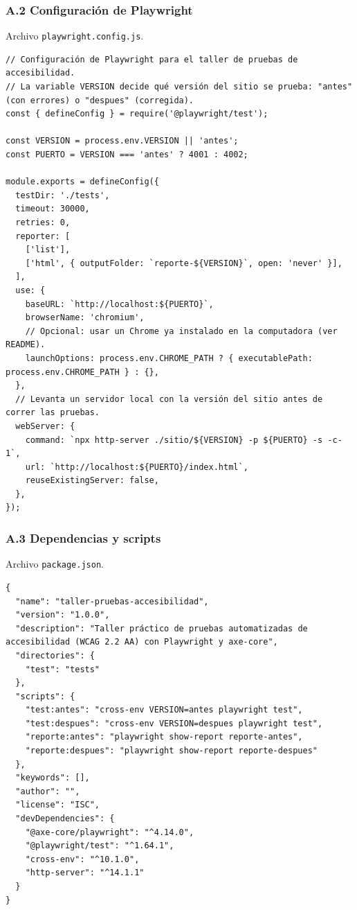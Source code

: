 \documentclass[10pt,letterpaper,onecolumn]{IEEEtran}
\begin{document}
\subsubsection{A.2 Configuración de Playwright}\label{a.2-configuraciuxf3n-de-playwright}

Archivo \texttt{playwright.\allowbreak{}\allowbreak{}config.\allowbreak{}\allowbreak{}js}.

\begin{lstlisting}
// Configuración de Playwright para el taller de pruebas de accesibilidad.
// La variable VERSION decide qué versión del sitio se prueba: "antes" (con errores) o "despues" (corregida).
const { defineConfig } = require('@playwright/test');

const VERSION = process.env.VERSION || 'antes';
const PUERTO = VERSION === 'antes' ? 4001 : 4002;

module.exports = defineConfig({
  testDir: './tests',
  timeout: 30000,
  retries: 0,
  reporter: [
    ['list'],
    ['html', { outputFolder: `reporte-${VERSION}`, open: 'never' }],
  ],
  use: {
    baseURL: `http://localhost:${PUERTO}`,
    browserName: 'chromium',
    // Opcional: usar un Chrome ya instalado en la computadora (ver README).
    launchOptions: process.env.CHROME_PATH ? { executablePath: process.env.CHROME_PATH } : {},
  },
  // Levanta un servidor local con la versión del sitio antes de correr las pruebas.
  webServer: {
    command: `npx http-server ./sitio/${VERSION} -p ${PUERTO} -s -c-1`,
    url: `http://localhost:${PUERTO}/index.html`,
    reuseExistingServer: false,
  },
});
\end{lstlisting}

\subsubsection{A.3 Dependencias y scripts}\label{a.3-dependencias-y-scripts}

Archivo \texttt{package.\allowbreak{}\allowbreak{}json}.

\begin{lstlisting}
{
  "name": "taller-pruebas-accesibilidad",
  "version": "1.0.0",
  "description": "Taller práctico de pruebas automatizadas de accesibilidad (WCAG 2.2 AA) con Playwright y axe-core",
  "directories": {
    "test": "tests"
  },
  "scripts": {
    "test:antes": "cross-env VERSION=antes playwright test",
    "test:despues": "cross-env VERSION=despues playwright test",
    "reporte:antes": "playwright show-report reporte-antes",
    "reporte:despues": "playwright show-report reporte-despues"
  },
  "keywords": [],
  "author": "",
  "license": "ISC",
  "devDependencies": {
    "@axe-core/playwright": "^4.14.0",
    "@playwright/test": "^1.64.1",
    "cross-env": "^10.1.0",
    "http-server": "^14.1.1"
  }
}
\end{lstlisting}
\end{document}
